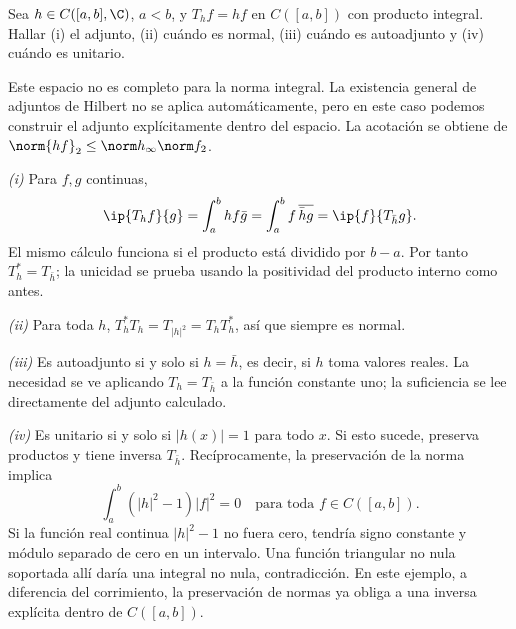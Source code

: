 \begin{ejercicio}\label{ej:lectura-32-10}
Sea $h\in C([a,b],\C)$, $a<b$, y $T_hf=hf$ en $C([a,b])$ con producto integral. Hallar (i) el adjunto, (ii) cuándo es normal, (iii) cuándo es autoadjunto y (iv) cuándo es unitario.
\end{ejercicio}
\begin{solucion}
Este espacio no es completo para la norma integral. La existencia general de adjuntos de Hilbert no se aplica automáticamente, pero en este caso podemos construir el adjunto explícitamente dentro del espacio. La acotación se obtiene de $\norm{hf}_2\leq\norm h_\infty\norm f_2$.

\emph{(i)} Para $f,g$ continuas,
\[
 \ip{T_hf}{g}=\int_a^b hf\bar g
 =\int_a^b f\,\overline{\bar h g}=\ip{f}{T_{\bar h}g}.
\]
El mismo cálculo funciona si el producto está dividido por $b-a$. Por tanto $T_h^*=T_{\bar h}$; la unicidad se prueba usando la positividad del producto interno como antes.

\emph{(ii)} Para toda $h$, $T_h^*T_h=T_{|h|^{2}}=T_hT_h^*$, así que siempre es normal.

\emph{(iii)} Es autoadjunto si y solo si $h=\bar h$, es decir, si $h$ toma valores reales. La necesidad se ve aplicando $T_h=T_{\bar h}$ a la función constante uno; la suficiencia se lee directamente del adjunto calculado.

\emph{(iv)} Es unitario si y solo si $|h(x)|=1$ para todo $x$. Si esto sucede, preserva productos y tiene inversa $T_{\bar h}$. Recíprocamente, la preservación de la norma implica
\[
 \int_a^b (|h|^{2}-1)|f|^{2}=0\quad\text{para toda }f\in C([a,b]).
\]
Si la función real continua $|h|^{2}-1$ no fuera cero, tendría signo constante y módulo separado de cero en un intervalo. Una función triangular no nula soportada allí daría una integral no nula, contradicción. En este ejemplo, a diferencia del corrimiento, la preservación de normas ya obliga a una inversa explícita dentro de $C([a,b])$.
\end{solucion}
